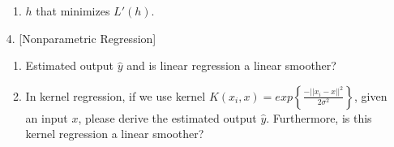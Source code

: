 \documentclass{article}
\begin{document}
\begin{enumerate}
\begin{enumerate}
		      \item $h$ that minimizes $L'(h)$.
	      \end{enumerate}
	\item [4.] [Nonparametric Regression]
	      \begin{enumerate}
		      \setlength\parindent{2em}
		      \item Estimated output $\hat{y}$ and is linear regression a linear smoother?
		      \item In kernel regression, if we use kernel $K(x_i,x)=exp\left\{\frac{-||x_i-x||^2}{2\sigma^2}\right\}$, given an input $x$, please derive the estimated output $\hat{y}$. Furthermore, is this kernel regression a linear smoother?
	      \end{enumerate}
\end{enumerate}
\end{document}
